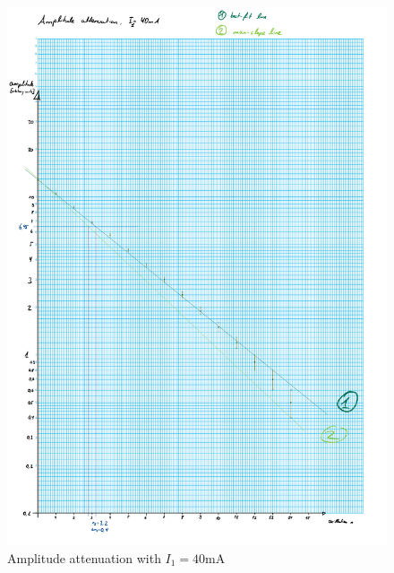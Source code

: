 \documentclass{article}
\begin{document}
\begin{figure} [p]
    \centering
    \includegraphics[width=\textwidth]{graphics/13-dia1.pdf}
    \caption{Amplitude attenuation with $I_1 = 40$mA}
    \label{fig:1}
\end{figure}
\end{document}
